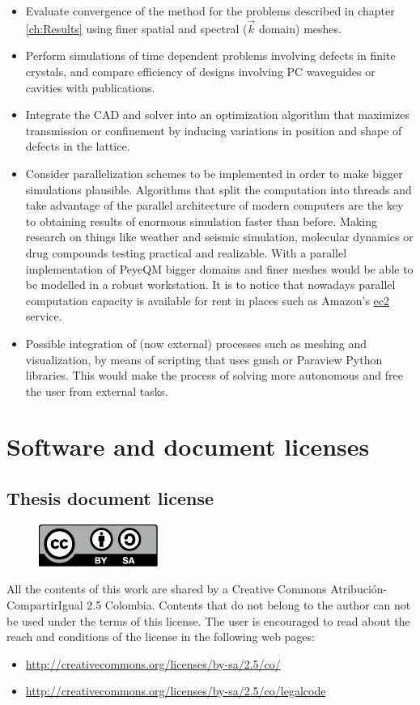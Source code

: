 \begin{itemize}
%
\item Evaluate convergence of the method for the problems described in chapter \ref{ch:Results} using finer spatial and spectral ($\vec{k}$ domain) meshes.
%
\item Perform simulations of time dependent problems involving defects in finite crystals, and compare efficiency of designs involving PC waveguides or cavities with publications.
%
\item Integrate the CAD and solver into an optimization algorithm that maximizes transmission or confinement by inducing variations in position and shape of defects in the lattice.
%
\item Consider parallelization schemes to be implemented in order to make bigger simulations plausible. Algorithms that split the computation into threads and take advantage of the parallel architecture of modern computers are the key to obtaining results of enormous simulation faster than before. Making research on things like weather and seismic simulation, molecular dynamics or drug compounds testing practical and realizable. With a parallel implementation of PeyeQM bigger domains and finer meshes would be able to be modelled in a robust workstation. It is to notice that nowadays parallel computation capacity is available for rent in places such as Amazon's \href{http://aws.amazon.com/ec2/}{ec2} service.
\item Possible integration of (now external) processes such as meshing and visualization, by means of scripting that uses gmsh or Paraview Python libraries. This would make the process of solving more autonomous and free the user from external tasks.
\end{itemize}

\chapter{Software and document licenses}

\section{Thesis document license}
\begin{figure}[h!]
\includegraphics[scale=2]{./img/CC-BY-SA_icon.pdf}
\end{figure}
All the contents of this work are shared by a Creative Commons Atribución-CompartirIgual 2.5 Colombia. Contents that do not belong to the author can not be used  under the terms of this license.
The user is encouraged to read about the reach and conditions of the license in the following web pages: 
\begin{itemize}
\item \url{http://creativecommons.org/licenses/by-sa/2.5/co/}
\item \url{http://creativecommons.org/licenses/by-sa/2.5/co/legalcode}
\end{itemize} 
